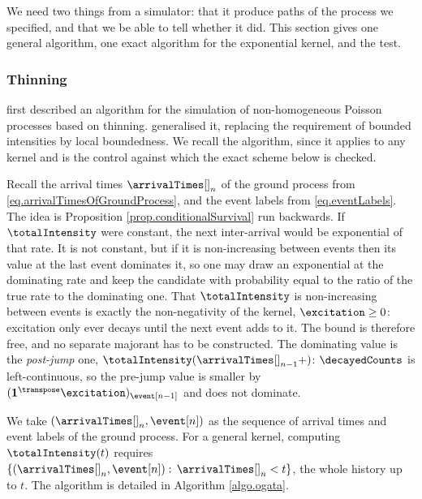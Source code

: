 We need two things from a simulator: that it produce paths of the process we specified,
and that we be able to tell whether it did.
This section gives one general algorithm, one exact algorithm for the exponential kernel,
and the test.

\subsubsection{Thinning}

\cite{LS79sim} first described an algorithm for the simulation of non-homogeneous Poisson
processes based on thinning.
\cite{Oga81lew} generalised it, replacing the requirement of bounded intensities by local
boundedness.
We recall the algorithm, since it applies to any kernel and is the control against which the
exact scheme below is checked.

Recall the arrival times $\arrivalTimes[ ]_n$ of the ground process
from \eqref{eq.arrivalTimesOfGroundProcess},
and the event labels from \eqref{eq.eventLabels}.
The idea is Proposition \ref{prop.conditionalSurvival} run backwards.
If $\totalIntensity$ were constant, 
the next inter-arrival would be exponential of that rate.
It is not constant,
but if it is non-increasing between events then its value at the last event
dominates it,
so one may draw an exponential at the dominating rate and keep the candidate with probability
equal to the ratio of the true rate to the dominating one.
That $\totalIntensity$ is non-increasing between events is exactly the non-negativity of the
kernel, $\excitation \geq 0$: excitation only ever decays until the next event adds to it.
The bound is therefore free, and no separate majorant has to be constructed.
The dominating value is the \emph{post-jump} one, $\totalIntensity(\arrivalTimes[]_{n-1}+)$:
$\decayedCounts$ is left-continuous, so the pre-jump value is smaller by
$(\mathbf{1}^{\transpose}\excitation)_{\event[n-1]}$ and does not dominate.

We take $(\arrivalTimes[]_n,\event[n])$ as the sequence of arrival times and event labels
of the ground process.
For a general kernel, computing $\totalIntensity(t)$ requires
$\lbrace(\arrivalTimes[]_n,\event[n]): \, \arrivalTimes[]_n <t\rbrace$,
the whole history up to $t$.
The algorithm is detailed in Algorithm \ref{algo.ogata}.

